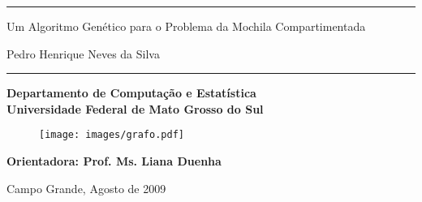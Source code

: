 
\begin{center}
\noindent \rule{\linewidth}{.1cm}

\vspace*{1cm}

{\LARGE \textsf{Um Algoritmo Genético para o Problema da Mochila Compartimentada}}

\vspace*{1cm}

{\Large \textsf{Pedro Henrique Neves da Silva}}

\vspace*{1cm}

\noindent \rule{\linewidth}{.1cm}

\vspace*{1cm}

{\large

\textbf{Departamento de Computação e Estatística} \\
\textbf{Universidade Federal de Mato Grosso do Sul}

}

\vspace*{1cm}

\begin{figure}[htb]
\begin{center}
\texttt{[image: images/grafo.pdf]}
\end{center}
\end{figure}
\vspace{2 cm}

\textbf{Orientadora: Prof. Ms. Liana Duenha}


Campo Grande, Agosto de 2009

\end{center}

\newpage


